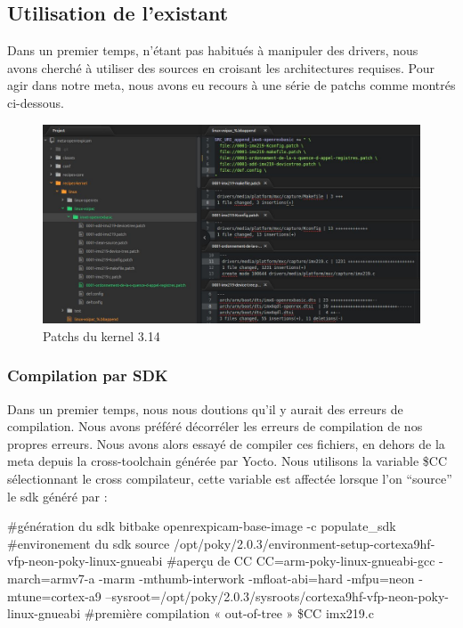{\subsection{Utilisation de l'existant}

Dans un premier temps, n’étant pas habitués à manipuler des drivers, nous \\ avons
cherché à utiliser des sources en croisant les architectures requises. Pour agir dans notre meta,
nous avons eu recours à une série de patchs comme montrés ci-dessous.

\begin{figure}[!htb]
    \centering
    \includegraphics[trim={0cm 0cm 0cm 0cm},clip,scale=0.35]{Figures/patchs.png}
    \decoRule
    \caption{Patchs du kernel 3.14} \label{fig:patchs}
\end{figure} 

\subsubsection{Compilation par SDK}

Dans un premier temps, nous nous doutions qu’il y aurait des erreurs de compilation.
Nous avons préféré décorréler les erreurs de compilation de nos propres erreurs. Nous
avons alors essayé de compiler ces fichiers, en dehors de la meta depuis la
cross-toolchain générée par Yocto. Nous utilisons la variable \$CC sélectionnant le cross
compilateur, cette variable est affectée lorsque l’on “source” le sdk généré par :

\begin{tcolorbox}
    \#génération du sdk
    bitbake openrexpicam-base-image -c populate\_sdk
    \#environement du sdk
    source /opt/poky/2.0.3/environment-setup-cortexa9hf-vfp-neon-poky-linux-gnueabi
    \#aperçu de CC
    CC=arm-poky-linux-gnueabi-gcc -march=armv7-a -marm -mthumb-interwork -mfloat-abi=hard -mfpu=neon
    -mtune=cortex-a9 –sysroot=/opt/poky/2.0.3/sysroots/cortexa9hf-vfp-neon-poky-linux-gnueabi
    \#première compilation « out-of-tree »
    \$CC imx219.c
\end{tcolorbox}

}
